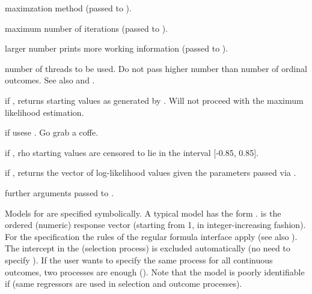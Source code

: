 \documentclass[letterpaper]{book}
\begin{document}
\begin{Arguments}
\begin{ldescription}
\item[\code{method}] maximzation method (passed to ).

\item[\code{iterlim}] maximum number of iterations (passed to ).

\item[\code{printLevel}] larger number prints more working information (passed to ).

\item[\code{nThreads}] number of threads to be used. Do not pass higher number than
number of ordinal outcomes. See also  and .

\item[\code{.get2step}] if , returns starting values as generated by . Will
not proceed with the maximum likelihood estimation.

\item[\code{.useR}] if  usese . Go grab a coffe.

\item[\code{.censorRho}] if , rho starting values are censored to lie in the
interval [-0.85, 0.85].

\item[\code{.loglik}] if , returns the vector of log-likelihood values given
the parameters passed via .

\item[\code{...}] further arguments passed to .
\end{ldescription}
\end{Arguments}
%
\begin{Details}
Models for  are specified symbolically. A typical model has the form
.  is the ordered (numeric)
response vector (starting from 1, in integer-increasing fashion). For the 
specification the rules of the regular formula interface apply (see also ).
The intercept in the  (selection process) is excluded automatically
(no need to specify ). If the user wants to specify the same process for
all continuous outcomes, two processes are enough ().
Note that the model is poorly identifiable if  (same regressors
are used in selection and outcome processes).
\end{Details}
\end{document}
